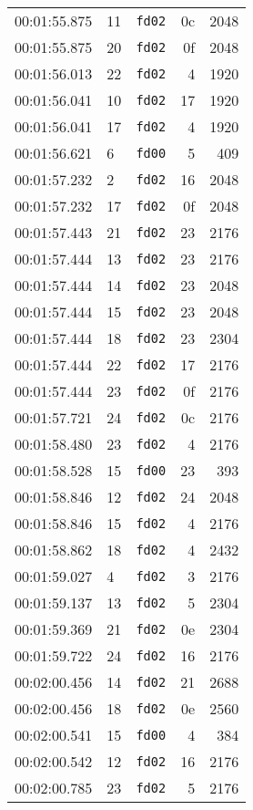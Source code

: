 \documentclass{article}
\begin{document}
\begin{longtable}{lllrr}
00:01:55.875 & 11 & \texttt{fd02} & 0c & 2048 \\
00:01:55.875 & 20 & \texttt{fd02} & 0f & 2048 \\
00:01:56.013 & 22 & \texttt{fd02} & 4 & 1920 \\
00:01:56.041 & 10 & \texttt{fd02} & 17 & 1920 \\
00:01:56.041 & 17 & \texttt{fd02} & 4 & 1920 \\
00:01:56.621 & 6 & \texttt{fd00} & 5 & 409 \\
00:01:57.232 & 2 & \texttt{fd02} & 16 & 2048 \\
00:01:57.232 & 17 & \texttt{fd02} & 0f & 2048 \\
00:01:57.443 & 21 & \texttt{fd02} & 23 & 2176 \\
00:01:57.444 & 13 & \texttt{fd02} & 23 & 2176 \\
00:01:57.444 & 14 & \texttt{fd02} & 23 & 2048 \\
00:01:57.444 & 15 & \texttt{fd02} & 23 & 2048 \\
00:01:57.444 & 18 & \texttt{fd02} & 23 & 2304 \\
00:01:57.444 & 22 & \texttt{fd02} & 17 & 2176 \\
00:01:57.444 & 23 & \texttt{fd02} & 0f & 2176 \\
00:01:57.721 & 24 & \texttt{fd02} & 0c & 2176 \\
00:01:58.480 & 23 & \texttt{fd02} & 4 & 2176 \\
00:01:58.528 & 15 & \texttt{fd00} & 23 & 393 \\
00:01:58.846 & 12 & \texttt{fd02} & 24 & 2048 \\
00:01:58.846 & 15 & \texttt{fd02} & 4 & 2176 \\
00:01:58.862 & 18 & \texttt{fd02} & 4 & 2432 \\
00:01:59.027 & 4 & \texttt{fd02} & 3 & 2176 \\
00:01:59.137 & 13 & \texttt{fd02} & 5 & 2304 \\
00:01:59.369 & 21 & \texttt{fd02} & 0e & 2304 \\
00:01:59.722 & 24 & \texttt{fd02} & 16 & 2176 \\
00:02:00.456 & 14 & \texttt{fd02} & 21 & 2688 \\
00:02:00.456 & 18 & \texttt{fd02} & 0e & 2560 \\
00:02:00.541 & 15 & \texttt{fd00} & 4 & 384 \\
00:02:00.542 & 12 & \texttt{fd02} & 16 & 2176 \\
00:02:00.785 & 23 & \texttt{fd02} & 5 & 2176 \\

\end{longtable}
\end{document}
